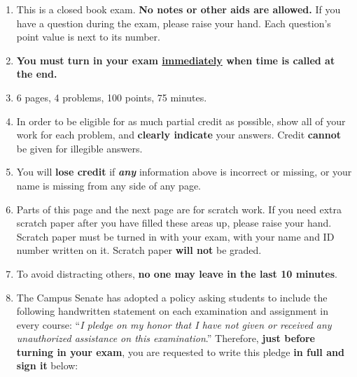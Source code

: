 \documentclass[11pt]{article}
\begin{document}
  \begin{enumerate}

    \addtolength{\itemsep}{-2mm}  %

    \item This is a closed book exam.  {\bf No
          notes %
          or other aids are allowed.}  If you have a question during the
          exam, please raise your hand.  Each question's point value is next
          to its number.

    \item {\bf You must turn in your exam \underline{immediately} when time is
          called at the end.}

    \item 6 pages, 4 problems, 100 points, 75 minutes.

    \item In order to be eligible for as much partial credit as possible,
          show all of your work for each problem, and \textbf{clearly
          indicate} your answers.  Credit \textbf{cannot} be given for
          illegible answers.

    \item You will \textbf{lose credit} if \emph{\textbf{any}} information
          above is incorrect or missing, or your name is missing from any
          side of any page.

    \item Parts of this page and the next page are for scratch work.  If
          you need extra scratch paper after you have filled these areas up,
          please raise your hand.  Scratch paper must be turned in with your
          exam, with your name and ID number written on it.  Scratch paper
          \textbf{will not} be graded.


    \item To avoid distracting others, \textbf{no one may leave in the
          last 10 minutes}.

    \item The Campus Senate has adopted a policy asking students to include
          the following handwritten statement on each examination and
          assignment in every course: ``\textit{I pledge on my honor that I
          have not given or received any unauthorized assistance on this
          examination\/}.''  Therefore, \textbf{just before turning in your
          exam}, you are requested to write this pledge \textbf{in full
          \textmd{and} sign it} below:


\end{enumerate}
\end{document}
